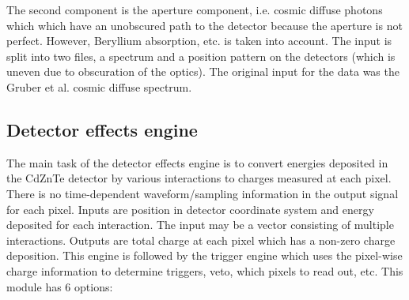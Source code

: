 The second component is the aperture component, i.e. cosmic diffuse photons which which have an unobscured path to the detector because the aperture is not perfect. However, Beryllium absorption, etc. is taken into account. The input is split into two files, a spectrum and a position pattern on the detectors (which is uneven due to obscuration of the optics). The original input for the data was the Gruber et al. cosmic diffuse spectrum. 


\subsection{Detector effects engine}

The main task of the detector effects engine is to convert energies
deposited in the CdZnTe detector by various interactions to charges
measured at each pixel.
There is no time-dependent waveform/sampling information in the output
signal for each pixel.
Inputs are position in detector coordinate system and energy
deposited for each interaction.
The input may be a vector consisting of multiple interactions.
Outputs are total charge at each pixel which has a non-zero charge
deposition.
This engine is followed by the trigger engine which uses the pixel-wise
charge information to determine triggers, veto, which pixels to read
out, etc. This module has 6 options:

